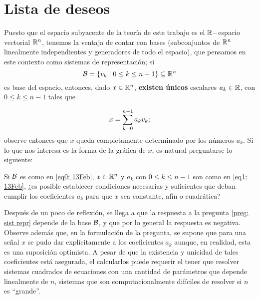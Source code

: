 \section{Lista de deseos}
Puesto que el espacio subyacente de 
la teoría de este trabajo es el $\mathbb{R}-$espacio vectorial 
$\mathbb{R}^{n}$, tenemos la ventaja de contar con
bases (subconjuntos de $\mathbb{R}^{n}$ linealmente
independientes y generadores de todo el espacio),
que pensamos en este contexto como sistemas
de representación; si 
\begin{equation}
\label{eq0: 13Feb}
\mathcal{B}=\{v_{k}
 \hspace{0.1cm} |
\hspace{0.1cm} 0 \leq k \leq n-1 \} 
\subseteq \mathbb{R}^{n}
\end{equation}
es base del espacio, entonces, dado $x \in \mathbb{R}^{n}$, 
\textbf{existen únicos}
escalares
$a_{k} \in \mathbb{R}$, con $0 \leq k \leq n-1$
tales que

\begin{equation}
\label{eq1: 13Feb}
x = \sum\limits_{k=0}^{n-1}a_{k}v_{k};
\end{equation}
observe entonces que $x$ 
queda completamente determinado por los
números $a_{k}$. Si lo que nos interesa es
la forma de la gráfica de $x$, es natural preguntarse lo siguiente:

\begin{preg}
\label{preg: sist repr}
Si $\mathcal{B}$ es como en \eqref{eq0: 13Feb}, $x \in \mathbb{R}^{n}$
y $a_{k}$ con $0 \leq k \leq n-1$ son como en 
\eqref{eq1: 13Feb}, ¿es posible establecer condiciones
necesarias y suficientes que deban cumplir los coeficientes
$a_{k}$ para que $x$ sea constante, afín o cuadrática?
\end{preg}

Después de un poco de reflexión, se llega a que la respuesta 
a la pregunta \ref{preg: sist repr} depende de la base
$\mathcal{B}$, y que por lo general la respuesta es negativa.
Observe además que, en la formulación de la pregunta,
se supone que para una señal $x$ se pudo dar
explícitamente a los coeficientes $a_{k}$ aunque,
en realidad,  esta es una suposición optimista.
A pesar de que la existencia y unicidad de tales
coeficientes está asegurada, el calcularlos
puede requerir el tener que resolver sistemas cuadrados
de ecuaciones con una cantidad de parámetros que
depende linealmente de $n$, sistemas que son computacionalmente
difíciles de resolver si $n$ es ``grande''.

